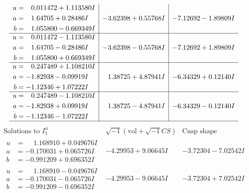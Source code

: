 \documentclass[1p]{elsarticle_modified}
\theoremstyle{definition}
\newcommand{\I}{\sqrt{-1}}
\begin{document}
$$\begin{array}{c|c|c}
\begin{aligned}
u &= \phantom{-}0.011472 + 1.113580 I \\
a &= \phantom{-}1.64705 + 0.28486 I \\
b &= \phantom{-}1.055800 - 0.669349 I\end{aligned}
 & -3.62398 + 0.55768 I & -7.12692 - 1.89809 I \\ \hline\begin{aligned}
u &= \phantom{-}0.011472 - 1.113580 I \\
a &= \phantom{-}1.64705 - 0.28486 I \\
b &= \phantom{-}1.055800 + 0.669349 I\end{aligned}
 & -3.62398 - 0.55768 I & -7.12692 + 1.89809 I \\ \hline\begin{aligned}
u &= \phantom{-}0.247489 + 1.108210 I \\
a &= -1.82938 - 0.09919 I \\
b &= -1.12346 + 1.07222 I\end{aligned}
 & \phantom{-}1.38725 + 4.87941 I & -6.34329 + 0.12140 I \\ \hline\begin{aligned}
u &= \phantom{-}0.247489 - 1.108210 I \\
a &= -1.82938 + 0.09919 I \\
b &= -1.12346 - 1.07222 I\end{aligned}
 & \phantom{-}1.38725 - 4.87941 I & -6.34329 - 0.12140 I\\
 \hline 
 \end{array}$$\newpage$$\begin{array}{c|c|c}  
\text{Solutions to }I^u_{1}& \I (\text{vol} + \sqrt{-1}CS) & \text{Cusp shape}\\
 \hline 
\begin{aligned}
u &= \phantom{-}1.168910 + 0.049676 I \\
a &= -0.170031 + 0.065726 I \\
b &= -0.991209 + 0.696352 I\end{aligned}
 & -4.29953 + 9.06645 I & -3.72304 - 7.02542 I \\ \hline\begin{aligned}
u &= \phantom{-}1.168910 - 0.049676 I \\
a &= -0.170031 - 0.065726 I \\
b &= -0.991209 - 0.696352 I\end{aligned}
 & -4.29953 - 9.06645 I & -3.72304 + 7.02542 I \\ \hline\begin{aligned}

\end{aligned}
\end{array}$$
\end{document}
